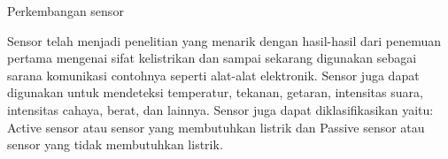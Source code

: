 Perkembangan sensor

Sensor telah menjadi penelitian yang menarik dengan hasil-hasil dari penemuan pertama 
mengenai sifat kelistrikan dan sampai sekarang digunakan sebagai sarana komunikasi
contohnya seperti alat-alat elektronik. Sensor juga dapat digunakan untuk mendeteksi
temperatur, tekanan, getaran, intensitas suara, intensitas cahaya, berat, dan lainnya.
Sensor juga dapat diklasifikasikan yaitu: Active sensor atau sensor yang membutuhkan listrik
dan Passive sensor atau sensor yang tidak membutuhkan listrik.